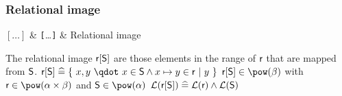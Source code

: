 \begin{samepage}
\subsubsection{Relational image}
\label{relational_image}
\begin{rrnames}
  $[\ldots]$  & \texttt{[}\ldots\texttt{]}  & Relational image
\end{rrnames}
\begin{rodinrefentry}
  \rrdesc
    The relational image $\textsf{r}[\textsf{S}]$ are those elements in the range of $\textsf{r}$
    that are mapped from $\textsf{S}$.
  \rrdef
    $\exprlr[\exprs] \defi \{~x,y~\qdot~x\in \exprs\land x\mapsto y\in\exprlr~|~y~\}$
  \rrtypes
    $\exprlr[\exprs]\in\pow(\beta)$ with $\exprlr\in\pow(\alpha\cprod\beta)$ and $\exprs\in\pow(\alpha)$
  \rrwd
    $\mathcal{L}(\textsf{r}[\textsf{S}])\mathrel{\widehat=}\mathcal{L}(\textsf{r})\land\mathcal{L}(\textsf{S})$
\end{rodinrefentry}
\end{samepage}

